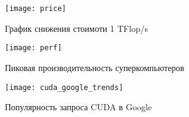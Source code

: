 \begin{figure}[h]
	\centering
	\texttt{[image: price]}
	\caption{График снижения стоимоти 1 TFlop/s}
	\label{intro:price}
\end{figure}
\begin{figure}[h]
	\centering
	\texttt{[image: perf]}
	\caption{Пиковая производительность суперкомпьютеров}
	\label{intro:perf}
\end{figure}
\begin{figure}[h]
	\centering
	\texttt{[image: cuda\_google\_trends]}
	\caption{Популярность запроса CUDA в Google}
	\label{intro:cuda}
\end{figure}
